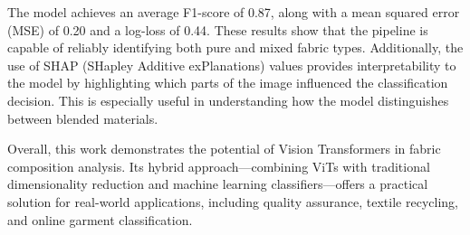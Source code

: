 The model achieves an average F1-score of 0.87, along with a mean squared error (MSE) of 0.20 and a log-loss of 0.44. These results show that the pipeline is capable of reliably identifying both pure and mixed fabric types. Additionally, the use of SHAP (SHapley Additive exPlanations) values provides interpretability to the model by highlighting which parts of the image influenced the classification decision. This is especially useful in understanding how the model distinguishes between blended materials.

Overall, this work demonstrates the potential of Vision Transformers in fabric composition analysis. Its hybrid approach—combining ViTs with traditional dimensionality reduction and machine learning classifiers—offers a practical solution for real-world applications, including quality assurance, textile recycling, and online garment classification.
